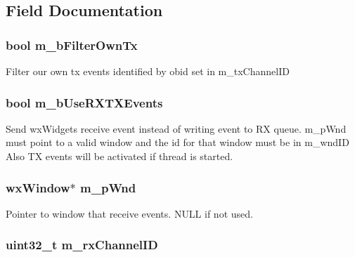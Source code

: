 \subsection{Field Documentation}
\hypertarget{classctrl_obj_vscp_tcp_if_a8a4453efbfba68f89494ccdb9cb77929}{
\subsubsection[{m\_\-bFilterOwnTx}]{\setlength{\rightskip}{0pt plus 5cm}bool {\bf m\_\-bFilterOwnTx}}}
\label{d8/dde/classctrl_obj_vscp_tcp_if_a8a4453efbfba68f89494ccdb9cb77929}
Filter our own tx events identified by obid set in m\_\-txChannelID \hypertarget{classctrl_obj_vscp_tcp_if_ae60bd1fba10f822b4076223b6468fb13}{
\subsubsection[{m\_\-bUseRXTXEvents}]{\setlength{\rightskip}{0pt plus 5cm}bool {\bf m\_\-bUseRXTXEvents}}}
\label{d8/dde/classctrl_obj_vscp_tcp_if_ae60bd1fba10f822b4076223b6468fb13}
Send wxWidgets receive event instead of writing event to RX queue. m\_\-pWnd must point to a valid window and the id for that window must be in m\_\-wndID Also TX events will be activated if thread is started. \hypertarget{classctrl_obj_vscp_tcp_if_ad48e93cc32b5c4bc1c741c2bc0615b1a}{
\subsubsection[{m\_\-pWnd}]{\setlength{\rightskip}{0pt plus 5cm}wxWindow$\ast$ {\bf m\_\-pWnd}}}
\label{d8/dde/classctrl_obj_vscp_tcp_if_ad48e93cc32b5c4bc1c741c2bc0615b1a}
Pointer to window that receive events. NULL if not used. \hypertarget{classctrl_obj_vscp_tcp_if_a22384f365f0617f660bed9330bb637d7}{
\subsubsection[{m\_\-rxChannelID}]{\setlength{\rightskip}{0pt plus 5cm}uint32\_\-t {\bf m\_\-rxChannelID}}}
